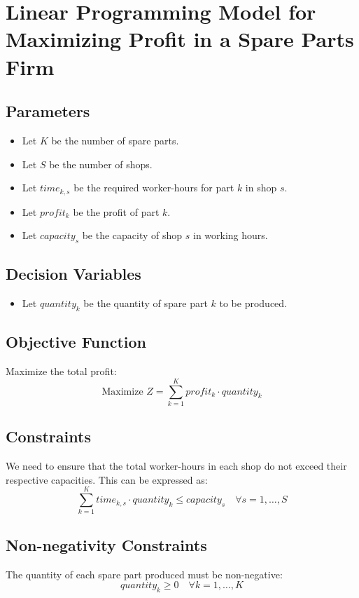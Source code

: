 \documentclass{article}
\begin{document}
\section*{Linear Programming Model for Maximizing Profit in a Spare Parts Firm}

\subsection*{Parameters}
\begin{itemize}
    \item Let \( K \) be the number of spare parts.
    \item Let \( S \) be the number of shops.
    \item Let \( time_{k, s} \) be the required worker-hours for part \( k \) in shop \( s \).
    \item Let \( profit_{k} \) be the profit of part \( k \).
    \item Let \( capacity_{s} \) be the capacity of shop \( s \) in working hours.
\end{itemize}

\subsection*{Decision Variables}
\begin{itemize}
    \item Let \( quantity_{k} \) be the quantity of spare part \( k \) to be produced.
\end{itemize}

\subsection*{Objective Function}
Maximize the total profit:
\[
\text{Maximize } Z = \sum_{k=1}^{K} profit_{k} \cdot quantity_{k}
\]

\subsection*{Constraints}
We need to ensure that the total worker-hours in each shop do not exceed their respective capacities. This can be expressed as:
\[
\sum_{k=1}^{K} time_{k, s} \cdot quantity_{k} \leq capacity_{s} \quad \forall s = 1, \ldots, S
\]

\subsection*{Non-negativity Constraints}
The quantity of each spare part produced must be non-negative:
\[
quantity_{k} \geq 0 \quad \forall k = 1, \ldots, K
\]
\end{document}
